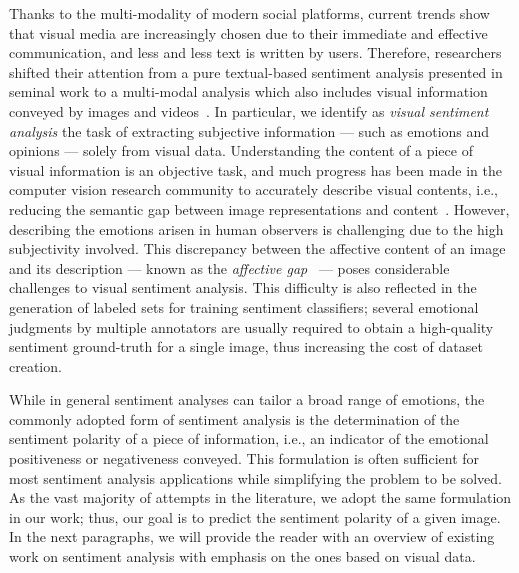 Thanks to the multi-modality of modern social platforms, current trends show that visual media are increasingly chosen due to their immediate and effective communication, and less and less text is written by users.
Therefore, researchers shifted their attention from a pure textual-based sentiment analysis presented in seminal work to a multi-modal analysis which also includes visual information conveyed by images and videos~\cite{borth2013large,cao2016cross,jou2015visual,siersdorfer2010analyzing,you2015robust,you2016cross}.
In particular, we identify as \emph{visual sentiment analysis} the task of extracting subjective information --- such as emotions and opinions --- solely from visual data.
Understanding the content of a piece of visual information is an objective task, and much progress has been made in the computer vision research community to accurately describe visual contents, i.e., reducing the semantic gap between image representations and content~\cite{li2016socializing}.
However, describing the emotions arisen in human observers is challenging due to the high subjectivity involved.
This discrepancy between the affective content of an image and its description --- known as the \emph{affective gap}~\cite{siersdorfer2010analyzing} --- poses considerable challenges to visual sentiment analysis.
This difficulty is also reflected in the generation of labeled sets for training sentiment classifiers;
several emotional judgments by multiple annotators are usually required to obtain a high-quality sentiment ground-truth for a single image, thus increasing the cost of dataset creation.

While in general sentiment analyses can tailor a broad range of emotions, the commonly adopted form of sentiment analysis is the determination of the sentiment polarity of a piece of information, i.e., an indicator of the emotional positiveness or negativeness conveyed.
This formulation is often sufficient for most sentiment analysis applications while simplifying the problem to be solved.
As the vast majority of attempts in the literature, we adopt the same formulation in our work;
thus, our goal is to predict the sentiment polarity of a given image.
In the next paragraphs, we will provide the reader with an overview of existing work on sentiment analysis with emphasis on the ones based on visual data.

